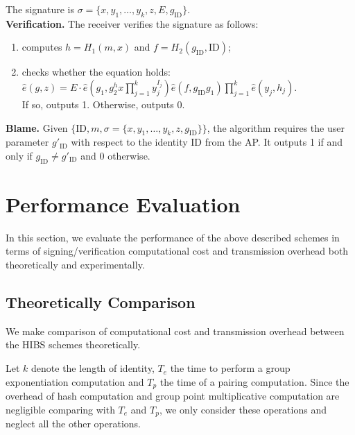 \documentclass[letter]{ieice}
\begin{document}
\par
The signature is $\sigma = \{x, y_1, \ldots, y_k, z, E, g_{\mathrm{ID}}\}$.
\\
\textbf{Verification.} The receiver verifies the signature as follows:
\begin{enumerate}
\item computes $h = H_1(m, x)$ and $f = H_2(g_\mathrm{ID}, \mathrm{ID})$;
\item checks whether the equation holds:\\
$\hat{e}(g, z) = E\cdot \hat{e}(g_1, g_2^hx\prod_{j=1}^k y_j^{I_j})\hat{e}(f, g_\mathrm{ID}g_1)\prod_{j=1}^k \hat{e}(y_j, h_j)$.\\
If so, outputs 1. Otherwise, outputs 0.
\end{enumerate}
\textbf{Blame.} 
Given $\{\mathrm{ID}, m, \sigma = \{x, y_1, \ldots, y_k, z, g_{\mathrm{ID}}\}\}$, the algorithm requires the user parameter $g'_{\mathrm{ID}}$ with respect to the identity ID from the AP. 
It outputs 1 if and only if $g_{\mathrm{ID}} \neq g'_{\mathrm{ID}}$ and 0 otherwise.

\section{Performance Evaluation} \label{sec-performance}
In this section, we evaluate the performance of the above described schemes in terms of signing/verification computational cost and transmission overhead both theoretically and experimentally.

\subsection{Theoretically Comparison}
We make comparison of computational cost and transmission overhead between the HIBS schemes theoretically.
\par

Let $k$ denote the length of identity, $T_{e}$ the time to perform a group exponentiation computation and $T_{p}$ the time of a pairing computation.
Since the overhead of hash computation and group point multiplicative computation are negligible comparing with $T_{e}$ and $T_{p}$, we only consider these operations and neglect all the other operations.
\par
\end{document}
